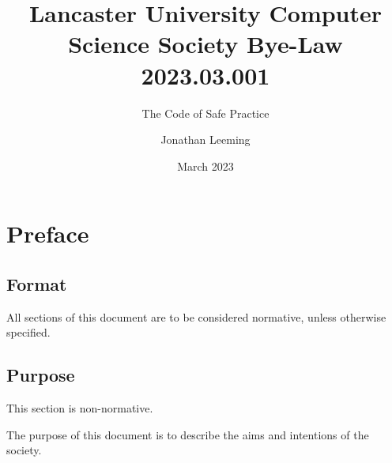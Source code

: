 \documentclass{scrartcl}
\title{Lancaster University Computer Science Society Bye-Law 2023.03.001}
\subtitle{The Code of Safe Practice}
\author{Jonathan Leeming}
\date{March 2023}
\begin{document}
    \maketitle
    
    \clearpage
    \tableofcontents

    \clearpage
    \section{Preface}
        \label{preface}
        \subsection{Format}
            \label{preface--format}
            All sections of this document are to be considered normative, unless otherwise specified.

        \subsection{Purpose}
            \label{preface--purpose}
            This section is non-normative.

            The purpose of this document is to describe the aims and intentions of the society.

    \clearpage
\end{document}
